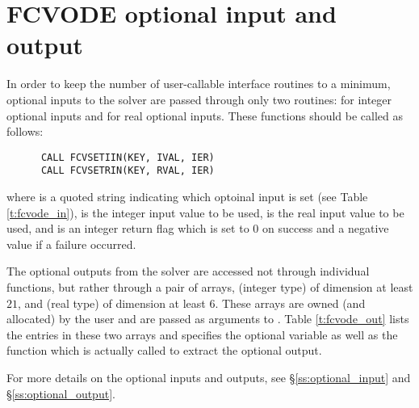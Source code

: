 

\section{FCVODE optional input and output}

In order to keep the number of user-callable {\fcvode} interface routines to
a minimum, optional inputs to the {\cvode} solver are passed through only
two routines:  for integer optional inputs and 
for real optional inputs. These functions should be called as follows:
\begin{verbatim}
      CALL FCVSETIIN(KEY, IVAL, IER)
      CALL FCVSETRIN(KEY, RVAL, IER)
\end{verbatim}
where  is a quoted string indicating which optoinal input is set
(see Table \ref{t:fcvode_in}),
 is the integer input value to be used,
 is the real input value to be used, and
 is an integer return flag which is set to $0$ on success and 
a negative value if a failure occurred.

The optional outputs from the {\cvode} solver are accessed not through
individual functions, but rather through a pair of arrays, 
(integer type) of dimension at least $21$, and  (real type) of
dimension at least $6$.  These arrays are owned (and allocated) by the user
and are passed as arguments to .
Table \ref{t:fcvode_out} lists the entries in these two arrays and specifies the
optional variable as well as the {\cvode} function which is actually called to
extract the optional output.

For more details on the optional inputs and outputs, see \S\ref{ss:optional_input}
and \S\ref{ss:optional_output}.

